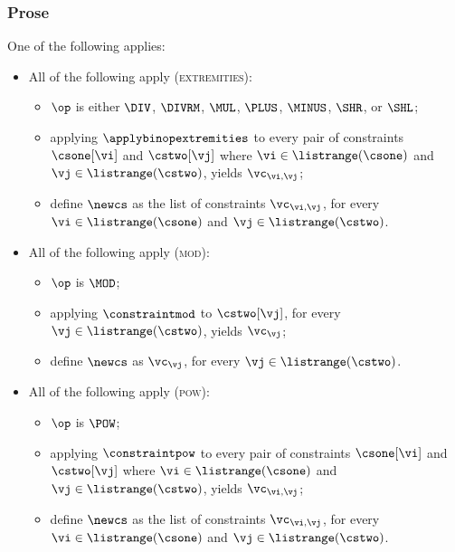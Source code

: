 \subsubsection{Prose}
One of the following applies:
\begin{itemize}
  \item All of the following apply (\textsc{extremities}):
  \begin{itemize}
    \item $\op$ is either $\DIV$, $\DIVRM$, $\MUL$, $\PLUS$, $\MINUS$, $\SHR$, or $\SHL$;
    \item applying $\applybinopextremities$ to every pair of constraints $\csone[\vi]$ and $\cstwo[\vj]$
          where $\vi\in\listrange(\csone)$ and $\vj\in\listrange(\cstwo)$, yields $\vc_{\vi,\vj}$;
    \item define $\newcs$ as the list of constraints $\vc_{\vi,\vj}$, for every
          $\vi\in\listrange(\csone)$ and $\vj\in\listrange(\cstwo)$.
  \end{itemize}

  \item All of the following apply (\textsc{mod}):
  \begin{itemize}
    \item $\op$ is $\MOD$;
    \item applying $\constraintmod$ to $\cstwo[\vj]$, for every $\vj\in\listrange(\cstwo)$, yields $\vc_\vj$;
    \item define $\newcs$ as $\vc_\vj$, for every $\vj\in\listrange(\cstwo)$.
  \end{itemize}

  \item All of the following apply (\textsc{pow}):
  \begin{itemize}
    \item $\op$ is $\POW$;
    \item applying $\constraintpow$ to every pair of constraints $\csone[\vi]$ and $\cstwo[\vj]$
          where $\vi\in\listrange(\csone)$ and $\vj\in\listrange(\cstwo)$, yields $\vc_{\vi,\vj}$;
    \item define $\newcs$ as the list of constraints $\vc_{\vi,\vj}$, for every
          $\vi\in\listrange(\csone)$ and $\vj\in\listrange(\cstwo)$.
  \end{itemize}
\end{itemize}

